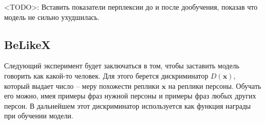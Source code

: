 \documentclass[]{article}
\begin{document}
<TODO>: Вставить показатели перплексии до и после дообучения, показав что модель не сильно ухудшилась.

\subsection{BeLikeX}

Следующий эксперимент будет заключаться в том, чтобы заставить модель говорить как какой-то человек. Для этого берется дискриминатор $D(\mathbf{x})$, который выдает число -- меру похожести реплики $\mathbf{x}$ на реплики персоны. Обучать его можно, имея примеры фраз нужной персоны и примеры фраз любых других персон. В дальнейшем этот дискриминатор используется как функция награды при обучении модели.


\newpage

%

\end{document}
